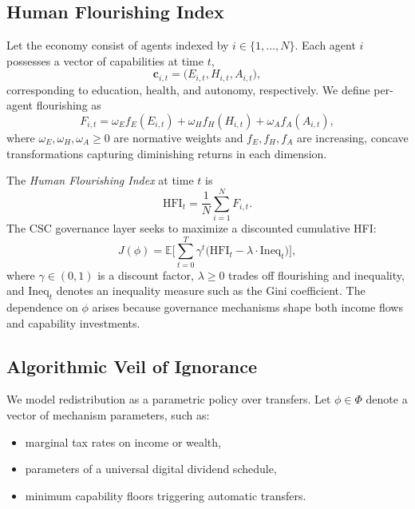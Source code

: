 \documentclass{article}
\begin{document}
\subsection{Human Flourishing Index}
\label{subsec:hfi}

Let the economy consist of agents indexed by $i \in \{1,\dots,N\}$. Each agent $i$ possesses a vector of capabilities at time $t$,
\begin{equation}
\mathbf{c}_{i,t} = \big(E_{i,t}, H_{i,t}, A_{i,t}\big),
\end{equation}
corresponding to education, health, and autonomy, respectively. We define per-agent flourishing as
\begin{equation}
F_{i,t} = \omega_E f_E(E_{i,t}) + \omega_H f_H(H_{i,t}) + \omega_A f_A(A_{i,t}),
\end{equation}
where $\omega_E,\omega_H,\omega_A \ge 0$ are normative weights and $f_E, f_H, f_A$ are increasing, concave transformations capturing diminishing returns in each dimension.

The \emph{Human Flourishing Index} at time $t$ is
\begin{equation}
\mathrm{HFI}_t = \frac{1}{N} \sum_{i=1}^N F_{i,t}.
\end{equation}
The CSC governance layer seeks to maximize a discounted cumulative HFI:
\begin{equation}
J(\phi) = \mathbb{E}\Bigg[\sum_{t=0}^{T} \gamma^t \Big(\mathrm{HFI}_t - \lambda \cdot \mathrm{Ineq}_t\Big)\Bigg],
\end{equation}
where $\gamma \in (0,1)$ is a discount factor, $\lambda \ge 0$ trades off flourishing and inequality, and $\mathrm{Ineq}_t$ denotes an inequality measure such as the Gini coefficient. The dependence on $\phi$ arises because governance mechanisms shape both income flows and capability investments.

\subsection{Algorithmic Veil of Ignorance}
\label{subsec:avoi}

We model redistribution as a parametric policy over transfers. Let $\phi \in \Phi$ denote a vector of mechanism parameters, such as:

\begin{itemize}
  \item marginal tax rates on income or wealth,
  \item parameters of a universal digital dividend schedule,
  \item minimum capability floors triggering automatic transfers.
\end{itemize}
\end{document}
